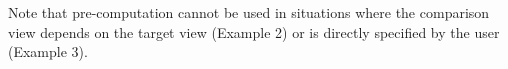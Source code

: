   Note that pre-computation cannot be used in situations where the comparison
  view depends on the target view (Example 2) or is directly specified by the
  user (Example 3).



